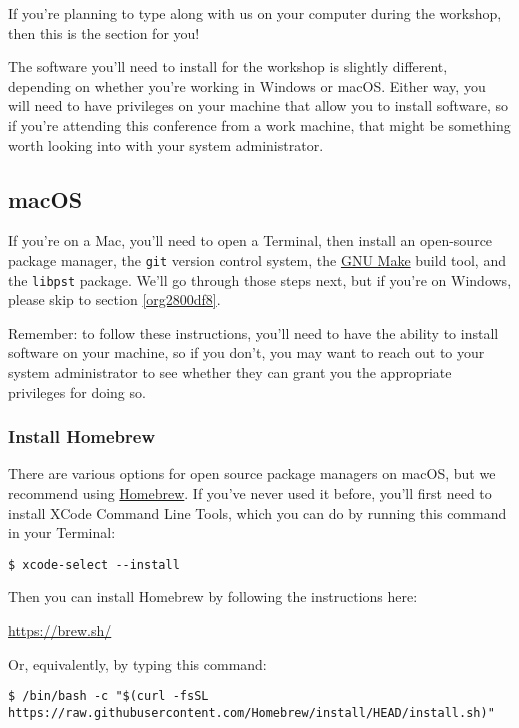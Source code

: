 \documentclass[11pt]{article}
\begin{document}
If you're planning to type along with us on your computer during the
workshop, then this is the section for you!

The software you'll need to install for the workshop is slightly
different, depending on whether you're working in Windows or macOS.
Either way, you will need to have privileges on your machine that
allow you to install software, so if you're attending this conference
from a work machine, that might be something worth looking into with
your system administrator.

\subsection{macOS}
\label{sec:orgef4d5c5}

If you're on a Mac, you'll need to open a Terminal, then install an
open-source package manager, the \texttt{git} version control system, the \href{https://www.gnu.org/software/make/}{GNU
Make} build tool, and the \texttt{libpst} package.  We'll go through those
steps next, but if you're on Windows, please skip to section \ref{org2800df8}.

Remember: to follow these instructions, you'll need to have the
ability to install software on your machine, so if you don't, you may
want to reach out to your system administrator to see whether they can
grant you the appropriate privileges for doing so.

\subsubsection{Install Homebrew}
\label{sec:org771233b}

There are various options for open source package managers on macOS,
but we recommend using \href{https://brew.sh}{Homebrew}.  If you've never used it
before, you'll first need to install XCode Command Line Tools, which
you can do by running this command in your Terminal:

\begin{verbatim}
$ xcode-select --install
\end{verbatim}

Then you can install Homebrew by following the instructions here:

\url{https://brew.sh/}

Or, equivalently, by typing this command:

\footnotesize

\begin{verbatim}
$ /bin/bash -c "$(curl -fsSL https://raw.githubusercontent.com/Homebrew/install/HEAD/install.sh)"
\end{verbatim}
\end{document}
